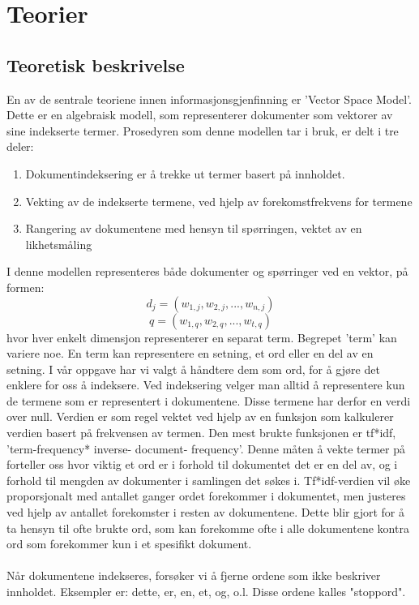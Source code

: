 \section{Teorier}

\subsection{Teoretisk beskrivelse}
En av de sentrale teoriene innen informasjonsgjenfinning er 'Vector Space Model'. Dette er en algebraisk modell, som representerer dokumenter som vektorer av sine indekserte termer. Prosedyren som denne modellen tar i bruk, er delt i tre deler:
\begin{enumerate}
\item{Dokumentindeksering er å trekke ut termer basert på innholdet.}
\item{Vekting av de indekserte termene, ved hjelp av forekomstfrekvens for termene}
\item{Rangering av dokumentene med hensyn til spørringen, vektet av en likhetsmåling}
\end{enumerate}
I denne modellen representeres både dokumenter og spørringer ved en vektor, på formen: \[d_j = (w_{1,j}, w_{2,j}, ..., w_{n,j})
\]
\[ 
q = (w_{1,q}, w_{2,q}, ..., w_{t,q})
\]
hvor hver enkelt dimensjon representerer en separat term. Begrepet 'term' kan variere noe. En term kan representere en setning, et ord eller en del av en setning. I vår oppgave har vi valgt å håndtere dem som ord, for å gjøre det enklere for oss å indeksere. Ved indeksering velger man alltid å representere kun de termene som er representert i dokumentene. Disse termene har derfor en verdi over null. Verdien er som regel vektet ved hjelp av en funksjon som kalkulerer verdien basert på frekvensen av termen. Den mest brukte funksjonen er tf*idf, 'term-frequency* inverse- document- frequency'. Denne måten å vekte termer på forteller oss hvor viktig et ord er i forhold til dokumentet det er en del av, og i forhold til mengden av dokumenter i samlingen det søkes i. Tf*idf-verdien vil øke proporsjonalt med antallet ganger ordet forekommer i dokumentet, men justeres ved hjelp av antallet forekomster i resten av dokumentene. Dette blir gjort for å ta hensyn til ofte brukte ord, som kan forekomme ofte i alle dokumentene kontra ord som forekommer kun i et spesifikt dokument. 

\paragraph{}
Når dokumentene indekseres, forsøker vi å fjerne ordene som ikke beskriver innholdet. Eksempler er: dette, er, en, et, og, o.l. Disse ordene kalles "stoppord". 

